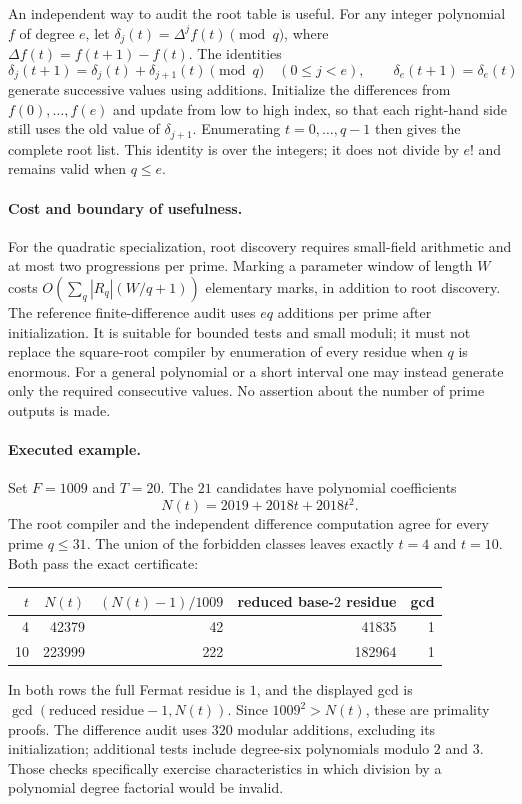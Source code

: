 \documentclass[11pt,a4paper]{article}
\theoremstyle{definition}\newtheorem{definition}[theorem]{Definition}
\theoremstyle{remark}\newtheorem{remark}[theorem]{Remark}
\begin{document}
An independent way to audit the root table is useful. For any integer
polynomial $f$ of degree $e$, let
$\delta_j(t)=\Delta^j f(t)\pmod q$, where $\Delta f(t)=f(t+1)-f(t)$.
The identities
\begin{equation}\label{eq:A08-difference}
 \delta_j(t+1)=\delta_j(t)+\delta_{j+1}(t)\pmod q
 \quad(0\le j<e),\qquad \delta_e(t+1)=\delta_e(t)
\end{equation}
generate successive values using additions. Initialize the differences from
$f(0),\ldots,f(e)$ and update from low to high index, so that each right-hand
side still uses the old value of $\delta_{j+1}$. Enumerating $t=0,\ldots,q-1$
then gives the complete root list. This identity is over the integers; it
does not divide by $e!$ and remains valid when $q\le e$.

\paragraph{Cost and boundary of usefulness.}
For the quadratic specialization, root discovery requires small-field
arithmetic and at most two progressions per prime. Marking a parameter
window of length $W$ costs
$O(\sum_q |R_q|(W/q+1))$ elementary marks, in addition to root discovery.
The reference finite-difference audit uses $eq$ additions per prime after
initialization. It is suitable for bounded tests and small moduli; it must
not replace the square-root compiler by enumeration of every residue when
$q$ is enormous. For a general polynomial or a short interval one may
instead generate only the required consecutive values. No assertion about
the number of prime outputs is made.

\paragraph{Executed example.}
Set $F=1009$ and $T=20$. The $21$ candidates have polynomial coefficients
\[
 N(t)=2019+2018t+2018t^2.
\]
The root compiler and the independent difference computation agree for
every prime $q\le31$. The union of the forbidden classes leaves exactly
$t=4$ and $t=10$. Both pass the exact certificate:
\begin{center}\small
\begin{tabular}{@{}rrrrr@{}}
\toprule
$t$ & $N(t)$ & $(N(t)-1)/1009$ & reduced base-$2$ residue & gcd\\
\midrule
4 & 42379 & 42 & 41835 & 1\\
10 & 223999 & 222 & 182964 & 1\\
\bottomrule
\end{tabular}
\end{center}
In both rows the full Fermat residue is $1$, and the displayed gcd is
$\gcd(\text{reduced residue}-1,N(t))$. Since $1009^2>N(t)$, these are
primality proofs. The difference audit uses $320$ modular additions,
excluding its initialization; additional tests include degree-six
polynomials modulo $2$ and $3$. Those checks specifically exercise
characteristics in which division by a polynomial degree factorial would
be invalid.
\end{document}
